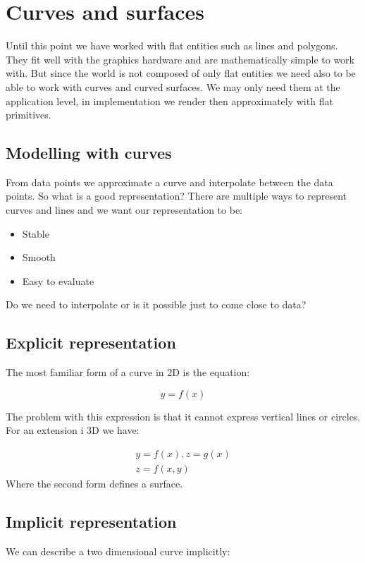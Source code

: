 \section{Curves and surfaces}
Until this point we have worked with flat entities such as lines and polygons. They fit well with the graphics hardware and are mathematically simple to work with. But since the world is not composed of only flat entities we need also to be able to work with curves and curved surfaces. We may only need them at the application level, in implementation we render then approximately with flat primitives. 

	\subsection*{Modelling with curves}
	From data points we approximate a curve and interpolate between the data points. So what is a good representation? There are multiple ways to represent curves and lines and we want our representation to be:

	\begin{itemize}
		\item Stable
		\item Smooth
		\item Easy to evaluate
	\end{itemize}

	Do we need to interpolate or is it possible just to come close to data? 

	\subsection*{Explicit representation}
	The most familiar form of a curve in 2D is the equation:

		\begin{equation}
			y = f(x)		
		\end{equation}

	The problem with this expression is that it cannot express vertical lines or circles. For an extension i 3D we have:

		\begin{equation}
		\begin{aligned}
			y = f(x), z = g(x) \\
			z = f(x,y)
		\end{aligned}
		\end{equation}
	Where the second form defines a surface. 

	\subsection*{Implicit representation}
	We can describe a two dimensional curve implicitly:

